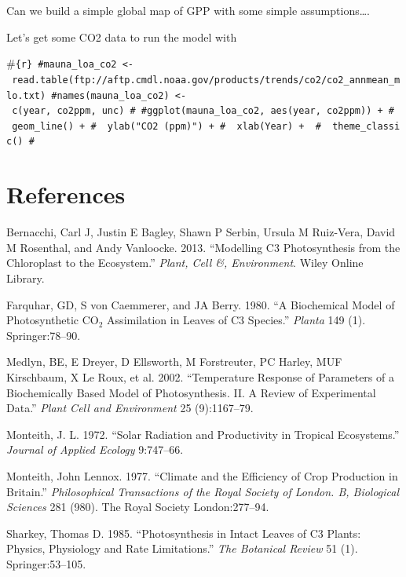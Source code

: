 \documentclass[]{article}
\begin{document}
Can we build a simple global map of GPP with some simple
assumptions\ldots{}.

Let's get some CO2 data to run the model with

\#\texttt{\{r\}\ \#mauna\_loa\_co2\ \textless{}-\ read.table(\textquotesingle{}ftp://aftp.cmdl.noaa.gov/products/trends/co2/co2\_annmean\_mlo.txt\textquotesingle{})\ \#names(mauna\_loa\_co2)\ \textless{}-\ c(\textquotesingle{}year\textquotesingle{},\ \textquotesingle{}co2ppm\textquotesingle{},\ \textquotesingle{}unc\textquotesingle{})\ \#\ \#ggplot(mauna\_loa\_co2,\ aes(year,\ co2ppm))\ +\ \#\ \ geom\_line()\ +\ \#\ \ ylab("CO2\ (ppm)")\ +\ \#\ \ xlab(\textquotesingle{}Year\textquotesingle{})\ +\ \ \#\ \ theme\_classic()\ \#}

\hypertarget{references}{%
\section*{References}\label{references}}

\hypertarget{refs}{}
\leavevmode\hypertarget{ref-Ber13}{}%
Bernacchi, Carl J, Justin E Bagley, Shawn P Serbin, Ursula M Ruiz-Vera,
David M Rosenthal, and Andy Vanloocke. 2013. ``Modelling C3
Photosynthesis from the Chloroplast to the Ecosystem.'' \emph{Plant,
Cell \&, Environment}. Wiley Online Library.

\leavevmode\hypertarget{ref-Far80}{}%
Farquhar, GD, S von Caemmerer, and JA Berry. 1980. ``A Biochemical Model
of Photosynthetic \(\mathrm{CO}_2\) Assimilation in Leaves of C3
Species.'' \emph{Planta} 149 (1). Springer:78--90.

\leavevmode\hypertarget{ref-Med02}{}%
Medlyn, BE, E Dreyer, D Ellsworth, M Forstreuter, PC Harley, MUF
Kirschbaum, X Le Roux, et al. 2002. ``Temperature Response of Parameters
of a Biochemically Based Model of Photosynthesis. II. A Review of
Experimental Data.'' \emph{Plant Cell and Environment} 25 (9):1167--79.

\leavevmode\hypertarget{ref-Mon72}{}%
Monteith, J. L. 1972. ``Solar Radiation and Productivity in Tropical
Ecosystems.'' \emph{Journal of Applied Ecology} 9:747--66.

\leavevmode\hypertarget{ref-Mon77}{}%
Monteith, John Lennox. 1977. ``Climate and the Efficiency of Crop
Production in Britain.'' \emph{Philosophical Transactions of the Royal
Society of London. B, Biological Sciences} 281 (980). The Royal Society
London:277--94.

\leavevmode\hypertarget{ref-Sha85}{}%
Sharkey, Thomas D. 1985. ``Photosynthesis in Intact Leaves of C3 Plants:
Physics, Physiology and Rate Limitations.'' \emph{The Botanical Review}
51 (1). Springer:53--105.
\end{document}
